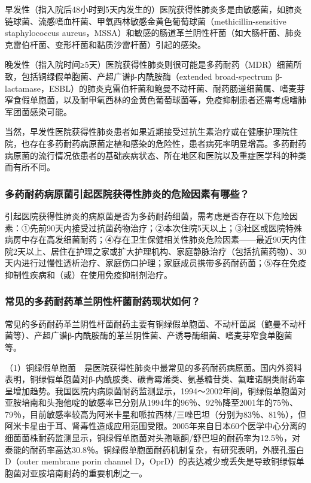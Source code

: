 早发性（指入院后48小时到5天内发生的）医院获得性肺炎多是由敏感菌，如肺炎链球菌、流感嗜血杆菌、甲氧西林敏感金黄色葡萄球菌（methicillin-sensitive
staphylococcus
aureus，MSSA）和敏感的肠道革兰阴性杆菌（如大肠杆菌、肺炎克雷伯杆菌、变形杆菌和黏质沙雷杆菌）引起的感染。

晚发性（指入院时间≥5天）医院获得性肺炎则很可能是多药耐药（MDR）细菌所致，包括铜绿假单胞菌、产超广谱β-内酰胺酶（extended
broad-spectrum
β-lactamase，ESBL）的肺炎克雷伯杆菌和鲍曼不动杆菌、耐药肠道细菌属、嗜麦芽窄食假单胞菌，以及耐甲氧西林的金黄色葡萄球菌等，免疫抑制患者还需考虑嗜肺军团菌感染可能。

当然，早发性医院获得性肺炎患者如果近期接受过抗生素治疗或在健康护理院住院，也存在多药耐药病原菌定植和感染的危险性，患者病死率明显增高。多药耐药病原菌的流行情况依患者的基础疾病状态、所在地区和医院以及重症医学科的种类而有所不同。

\subsubsection{多药耐药病原菌引起医院获得性肺炎的危险因素有哪些？}

引起医院获得性肺炎的病原菌是否为多药耐药细菌，需考虑是否存在以下危险因素：①先前90天内接受过抗菌药物治疗；②本次住院5天以上；③社区或医院特殊病房中存在高发细菌耐药；④存在卫生保健相关性肺炎危险因素------最近90天内住院2天以上、居住在护理之家或扩大护理机构、家庭静脉治疗（包括抗菌药物）、30天内进行过慢性透析治疗、家庭伤口护理；家庭成员携带多药耐药菌；⑤存在免疫抑制性疾病和（或）在使用免疫抑制剂治疗。

\subsubsection{常见的多药耐药革兰阴性杆菌耐药现状如何？}

常见的多药耐药革兰阴性杆菌耐药主要有铜绿假单胞菌、不动杆菌属（鲍曼不动杆菌等）、产超广谱β-内酰胺酶的革兰阴性菌、产诱导酶细菌、嗜麦芽窄食单胞菌等。

（1）铜绿假单胞菌　是医院获得性肺炎中最常见的多药耐药病原菌。国内外资料表明，铜绿假单胞菌对β-内酰胺类、碳青霉烯类、氨基糖苷类、氟喹诺酮类耐药率呈增加趋势。我国医院内病原菌耐药监测显示，1994～2002年间，铜绿假单胞菌对亚胺培南和头孢他啶的敏感率已分别从1994年的96％、92％降至2001年的75％、79％，目前敏感率较高为阿米卡星和哌拉西林/三唑巴坦（分别为83％、81％），但阿米卡星由于耳、肾毒性造成应用范围受限。2005年来自日本60个医学中心分离的细菌菌株耐药监测显示，铜绿假单胞菌对头孢哌酮/舒巴坦的耐药率为12.5％，对泰能的耐药率高达30.8％。铜绿假单胞菌耐药机制复杂，有研究表明，外膜孔蛋白D（outer
membrane porin channel
D，OprD）的表达减少或丢失是导致铜绿假单胞菌对亚胺培南耐药的重要机制之一。


